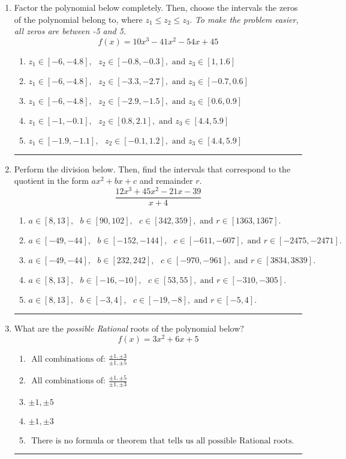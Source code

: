 \documentclass[14pt]{extbook}
\newcommand{\litem}[1]{\item#1\hspace*{-1cm}\rule{\textwidth}{0.4pt}}
\begin{document}
\begin{enumerate}
{\begin{enumerate}[label=\Alph*.]
\end{enumerate} }
\litem{
Factor the polynomial below completely. Then, choose the intervals the zeros of the polynomial belong to, where $z_1 \leq z_2 \leq z_3$. \textit{To make the problem easier, all zeros are between -5 and 5.}\[ f(x) = 10x^{3} -41 x^{2} -54 x + 45 \]\begin{enumerate}[label=\Alph*.]
\item \( z_1 \in [-6, -4.8], \text{   }  z_2 \in [-0.8, -0.3], \text{   and   } z_3 \in [1, 1.6] \)
\item \( z_1 \in [-6, -4.8], \text{   }  z_2 \in [-3.3, -2.7], \text{   and   } z_3 \in [-0.7, 0.6] \)
\item \( z_1 \in [-6, -4.8], \text{   }  z_2 \in [-2.9, -1.5], \text{   and   } z_3 \in [0.6, 0.9] \)
\item \( z_1 \in [-1, -0.1], \text{   }  z_2 \in [0.8, 2.1], \text{   and   } z_3 \in [4.4, 5.9] \)
\item \( z_1 \in [-1.9, -1.1], \text{   }  z_2 \in [-0.1, 1.2], \text{   and   } z_3 \in [4.4, 5.9] \)

\end{enumerate} }
\litem{
Perform the division below. Then, find the intervals that correspond to the quotient in the form $ax^2+bx+c$ and remainder $r$.\[ \frac{12x^{3} +45 x^{2} -21 x -39}{x + 4} \]\begin{enumerate}[label=\Alph*.]
\item \( a \in [8, 13], \text{   } b \in [90, 102], \text{   } c \in [342, 359], \text{   and   } r \in [1363, 1367]. \)
\item \( a \in [-49, -44], \text{   } b \in [-152, -144], \text{   } c \in [-611, -607], \text{   and   } r \in [-2475, -2471]. \)
\item \( a \in [-49, -44], \text{   } b \in [232, 242], \text{   } c \in [-970, -961], \text{   and   } r \in [3834, 3839]. \)
\item \( a \in [8, 13], \text{   } b \in [-16, -10], \text{   } c \in [53, 55], \text{   and   } r \in [-310, -305]. \)
\item \( a \in [8, 13], \text{   } b \in [-3, 4], \text{   } c \in [-19, -8], \text{   and   } r \in [-5, 4]. \)

\end{enumerate} }
\litem{
What are the \textit{possible Rational} roots of the polynomial below?\[ f(x) = 3x^{2} +6 x + 5 \]\begin{enumerate}[label=\Alph*.]
\item \( \text{ All combinations of: }\frac{\pm 1,\pm 3}{\pm 1,\pm 5} \)
\item \( \text{ All combinations of: }\frac{\pm 1,\pm 5}{\pm 1,\pm 3} \)
\item \( \pm 1,\pm 5 \)
\item \( \pm 1,\pm 3 \)
\item \( \text{ There is no formula or theorem that tells us all possible Rational roots.} \)

\end{enumerate} }
\end{enumerate}
\end{document}
